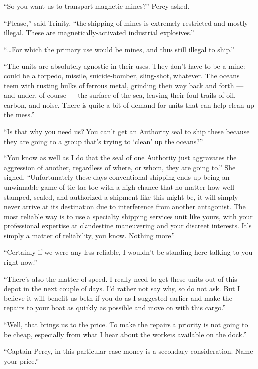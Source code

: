 \documentclass[
]{scrbook}
\begin{document}
``So you want us to transport magnetic mines?'' Percy asked.

``Please,'' said Trinity, ``the shipping of mines is extremely
restricted and mostly illegal. These are magnetically-activated
industrial explosives.''

``\ldots For which the primary use would be mines, and thus still
illegal to ship.''

``The units are absolutely agnostic in their uses. They don't have to be
a mine: could be a torpedo, missile, suicide-bomber, sling-shot,
whatever. The oceans teem with rusting hulks of ferrous metal, grinding
their way back and forth --- and under, of course --- the surface of the
sea, leaving their foul trails of oil, carbon, and noise. There is quite
a bit of demand for units that can help clean up the mess.''

``Is that why you need us? You can't get an Authority seal to ship these
because they are going to a group that's trying to `clean' up the
oceans?''

``You know as well as I do that the seal of one Authority just
aggravates the aggression of another, regardless of where, or whom, they
are going to.'' She sighed. ``Unfortunately these days conventional
shipping ends up being an unwinnable game of tic-tac-toe with a high
chance that no matter how well stamped, sealed, and authorized a
shipment like this might be, it will simply never arrive at its
destination due to interference from another antagonist. The most
reliable way is to use a specialty shipping services unit like yours,
with your professional expertise at clandestine maneuvering and your
discreet interests. It's simply a matter of reliability, you know.
Nothing more.''

``Certainly if we were any less reliable, I wouldn't be standing here
talking to you right now.''

``There's also the matter of speed. I really need to get these units out
of this depot in the next couple of days. I'd rather not say why, so do
not ask. But I believe it will benefit us both if you do as I suggested
earlier and make the repairs to your boat as quickly as possible and
move on with this cargo.''

``Well, that brings us to the price. To make the repairs a priority is
not going to be cheap, especially from what I hear about the workers
available on the dock.''

``Captain Percy, in this particular case money is a secondary
consideration. Name your price.''
\end{document}
